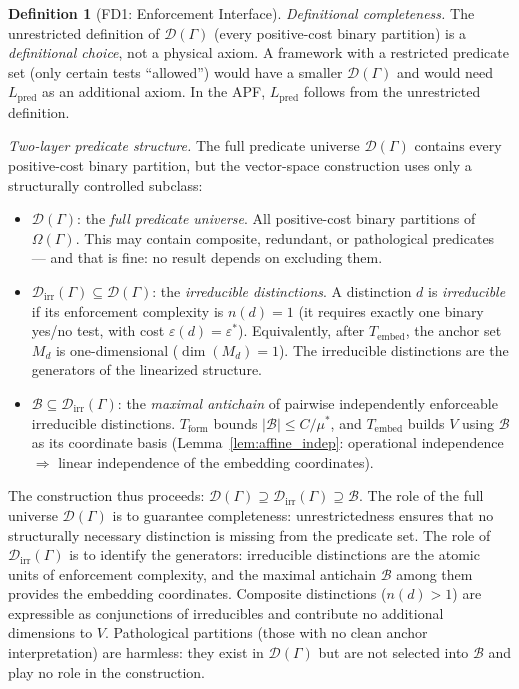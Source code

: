 \documentclass[11pt,a4paper]{article}
\theoremstyle{definition}
\newtheorem{definition}[theorem]{Definition}
\newcommand{\eps}{\varepsilon}
\begin{document}
\begin{definition}[FD1: Enforcement Interface]
\smallskip\noindent\textit{Definitional completeness.}  The unrestricted definition of $\mathcal{D}(\Gamma)$ (every positive-cost binary partition) is a \emph{definitional choice}, not a physical axiom.  A framework with a restricted predicate set (only certain tests ``allowed'') would have a smaller $\mathcal{D}(\Gamma)$ and would need $L_{\mathrm{pred}}$ as an additional axiom.  In the APF, $L_{\mathrm{pred}}$ follows from the unrestricted definition.

\smallskip\noindent\textit{Two-layer predicate structure.}  The full predicate universe $\mathcal{D}(\Gamma)$ contains every positive-cost binary partition, but the vector-space construction uses only a structurally controlled subclass:
\begin{itemize}[nosep,leftmargin=2em,itemsep=3pt]
\item $\mathcal{D}(\Gamma)$: the \emph{full predicate universe}.  All positive-cost binary partitions of $\Omega(\Gamma)$.  This may contain composite, redundant, or pathological predicates --- and that is fine: no result depends on excluding them.
\item $\mathcal{D}_{\mathrm{irr}}(\Gamma) \subseteq \mathcal{D}(\Gamma)$: the \emph{irreducible distinctions}.  A distinction $d$ is \emph{irreducible} if its enforcement complexity is $n(d) = 1$ (it requires exactly one binary yes/no test, with cost $\eps(d) = \eps^*$).  Equivalently, after $T_{\mathrm{embed}}$, the anchor set $M_d$ is one-dimensional ($\dim(M_d) = 1$).  The irreducible distinctions are the generators of the linearized structure.
\item $\mathcal{B} \subseteq \mathcal{D}_{\mathrm{irr}}(\Gamma)$: the \emph{maximal antichain} of pairwise independently enforceable irreducible distinctions.  $T_{\mathrm{form}}$ bounds $|\mathcal{B}| \le C/\mu^*$, and $T_{\mathrm{embed}}$ builds $V$ using $\mathcal{B}$ as its coordinate basis (Lemma~\ref{lem:affine_indep}: operational independence $\Rightarrow$ linear independence of the embedding coordinates).
\end{itemize}
The construction thus proceeds: $\mathcal{D}(\Gamma) \supseteq \mathcal{D}_{\mathrm{irr}}(\Gamma) \supseteq \mathcal{B}$.  The role of the full universe $\mathcal{D}(\Gamma)$ is to guarantee completeness: unrestrictedness ensures that no structurally necessary distinction is missing from the predicate set.  The role of $\mathcal{D}_{\mathrm{irr}}(\Gamma)$ is to identify the generators: irreducible distinctions are the atomic units of enforcement complexity, and the maximal antichain $\mathcal{B}$ among them provides the embedding coordinates.  Composite distinctions ($n(d) > 1$) are expressible as conjunctions of irreducibles and contribute no additional dimensions to $V$.  Pathological partitions (those with no clean anchor interpretation) are harmless: they exist in $\mathcal{D}(\Gamma)$ but are not selected into $\mathcal{B}$ and play no role in the construction.
\end{definition}
\end{document}
